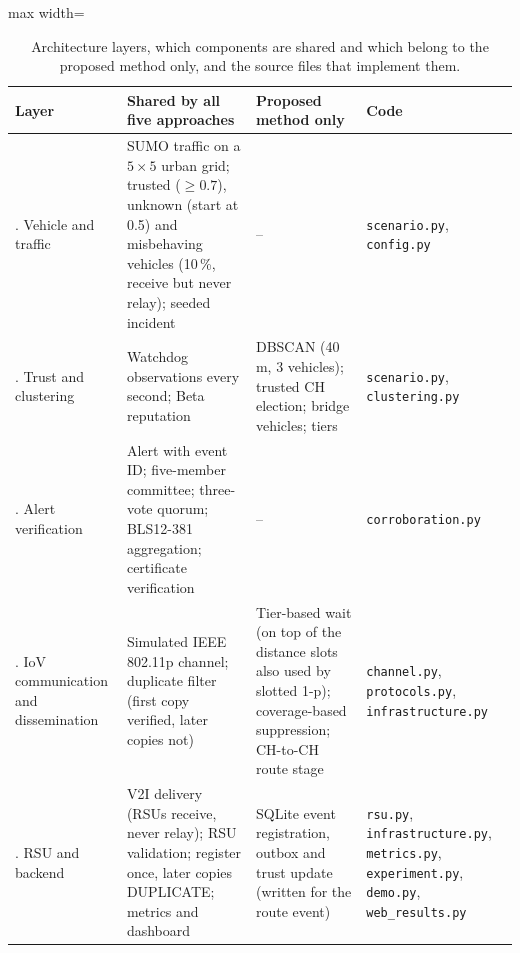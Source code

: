 \documentclass[11pt, a4paper]{article}
\begin{document}
\begin{table}[H]
\centering
\footnotesize
\renewcommand{\arraystretch}{1.2}
\begin{adjustbox}{max width=\textwidth}
\begin{tabular}{|>{\raggedright\arraybackslash}p{2.7cm}|>{\raggedright\arraybackslash}p{5.6cm}|>{\raggedright\arraybackslash}p{4.0cm}|>{\raggedright\arraybackslash}p{3.3cm}|}
\hline
\textbf{Layer} & \textbf{Shared by all five approaches} & \textbf{Proposed method only} & \textbf{Code} \\
\hline
1. Vehicle and traffic & SUMO traffic on a $5\times5$ urban grid; trusted ($\geq 0.7$), unknown (start at 0.5) and misbehaving vehicles (10\,\%, receive but never relay); seeded incident & -- & \texttt{scenario.py}, \texttt{config.py} \\
\hline
2. Trust and clustering & Watchdog observations every second; Beta reputation & DBSCAN (40 m, 3 vehicles); trusted CH election; bridge vehicles; tiers & \texttt{scenario.py}, \texttt{clustering.py} \\
\hline
3. Alert verification & Alert with event ID; five-member committee; three-vote quorum; BLS12-381 aggregation; certificate verification & -- & \texttt{corroboration.py} \\
\hline
4. IoV communication and dissemination & Simulated IEEE 802.11p channel; duplicate filter (first copy verified, later copies not) & Tier-based wait (on top of the distance slots also used by slotted 1-p); coverage-based suppression; CH-to-CH route stage & \texttt{channel.py}, \texttt{protocols.py}, \texttt{infrastructure.py} \\
\hline
5. RSU and backend & V2I delivery (RSUs receive, never relay); RSU validation; register once, later copies DUPLICATE; metrics and dashboard & SQLite event registration, outbox and trust update (written for the route event) & \texttt{rsu.py}, \texttt{infrastructure.py}, \texttt{metrics.py}, \texttt{experiment.py}, \texttt{demo.py}, \texttt{web\_results.py} \\
\hline
\end{tabular}
\end{adjustbox}
\caption{Architecture layers, which components are shared and which belong to the proposed method only, and the source
files that implement them.}
\label{tab:layers}
\end{table}
\end{document}
